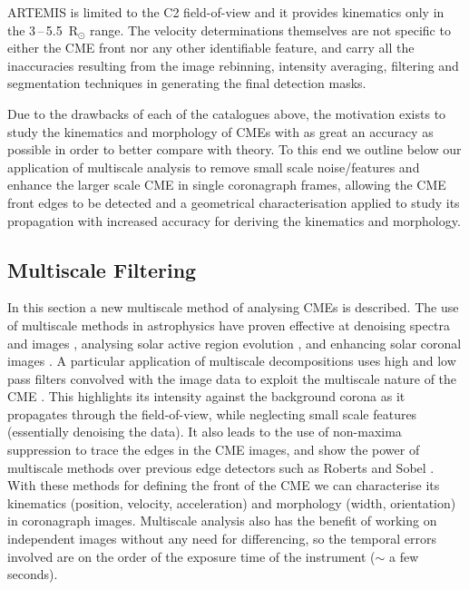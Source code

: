 \documentclass[namedreferences]{SolarPhysics}
\begin{document}
\begin{article}
ARTEMIS is limited to the C2 field-of-view and it provides kinematics only in the 3\,--\,5.5~R$_{\odot}$ range. The velocity determinations themselves are not specific to either the CME front nor any other identifiable feature, and carry all the inaccuracies resulting from the image rebinning, intensity averaging, filtering and segmentation techniques in generating the final detection masks.
\par
Due to the drawbacks of each of the catalogues above, the motivation exists to study the kinematics and morphology of CMEs with as great an accuracy as possible in order to better compare with theory. To this end we outline below our application of multiscale analysis to remove small scale noise/features and enhance the larger scale CME in single coronagraph frames, allowing the CME front edges to be detected and a geometrical characterisation applied to study its propagation with increased accuracy for deriving the kinematics and morphology.

\subsection{Multiscale Filtering}

In this section a new multiscale method of analysing CMEs is described. The use of multiscale methods in astrophysics have proven effective at denoising spectra and images \citep{1995A&AS..112..179M, 1997A&AS..124..579F}, analysing solar active region evolution \citep{2008SoPh..248..311H}, and enhancing solar coronal images \citep{2003A&A...398.1185S, 2008ApJ...674.1201S}.  A particular application of multiscale decompositions uses high and low pass filters convolved with the image data to exploit the multiscale nature of the CME \citep{2008SoPh..248..457Y}. This highlights its intensity against the background corona as it propagates through the field-of-view, while neglecting small scale features (essentially denoising the data). It also leads to the use of non-maxima suppression to trace the edges in the CME images, and  \citet{2008SoPh..248..457Y} show the power of multiscale methods over previous edge detectors such as Roberts \citep{1975CGIP....4..248D} and Sobel \citep{1973pcsa.book.....D}. With these methods for defining the front of the CME we can characterise its kinematics (position, velocity, acceleration) and morphology (width, orientation) in coronagraph images. Multiscale analysis also has the benefit of working on independent images without any need for differencing, so the temporal errors involved are on the order of the exposure time of the instrument ($\sim$ a few seconds). 


\end{article}
\end{document}

